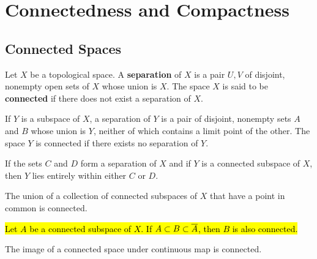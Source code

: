 \newpage
\setcounter{section}{2}
\section{Connectedness and Compactness}

\subsection{Connected Spaces}\nl
\setcounter{section}{23}
\setcounter{thm}{0}

\vs

\dfn Let $X$ be a topological space. A \textbf{separation} of $X$ is a pair $U, V$ of disjoint, nonempty open sets of $X$ whose union is $X$. The space $X$ is said to be \textbf{connected} if there does not exist a separation of $X$.

\vs

\begin{lem}
If $Y$ is a subspace of $X$, a separation of $Y$ is a pair of disjoint, nonempty sets $A$ and $B$ whose union is $Y$, neither of which contains a limit point of the other. The space $Y$ is connected if there exists no separation of $Y$.
\end{lem}

\vs

\begin{lem}
If the sets $C$ and $D$ form a separation of $X$ and if $Y$ is a connected subspace of $X$, then $Y$ lies entirely within either $C$ or $D$.
\end{lem}

\vs

\begin{thm}
The union of a collection of connected subspaces of $X$ that have a point in common is connected.
\end{thm}

\vs

\begin{thm}
\hl{Let $A$ be a connected subspace of $X$. If $A\subset B\subset \overline A$, then $B$ is also connected.}
\end{thm}

\vs     

\begin{thm}
The image of a connected space under continuous map is connected.
\end{thm}

